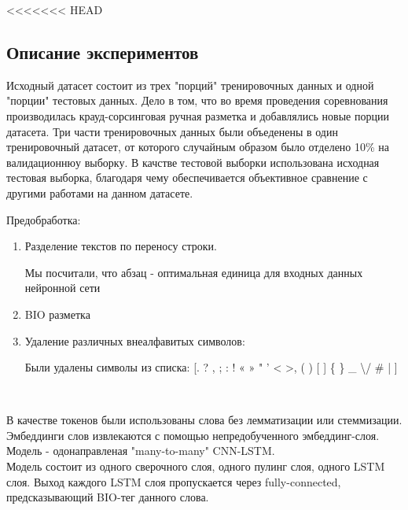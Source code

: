 \documentclass{article}
\begin{document}
<<<<<<< HEAD
\subsection{Описание экспериментов}
Исходный датасет состоит из трех "порций" тренировочных данных и одной "порции" тестовых данных. Дело в том, что во время проведения соревнования производилась крауд-сорсинговая ручная разметка и добавлялись новые порции датасета. Три части тренировочных данных были объеденены в один тренировочный датасет, от которого случайным образом было отделено 10\% на валидационнюу выборку. В качстве тестовой выборки использована исходная тестовая выборка, благодаря чему обеспечивается объективное сравнение с другими работами на данном датасете.
\newline

Предобработка:

\begin{enumerate}
    \item Разделение текстов по переносу строки.

        Мы посчитали, что абзац - оптимальная единица для входных данных нейронной сети

    \item BIO разметка

    \item Удаление различных внеалфавитых символов:

        Были удалены символы из списка: [. ? , ; : ! « » " ' < >,  ( ) [ ] \{ \} \newline
         \─ \- \_ \textbackslash / \# \№ | ] %

\end{enumerate}  \\


\vspace{14pt}

В качестве токенов были использованы слова без лемматизации или стеммизации. \\ %

Эмбеддинги слов извлекаются с помощью непредобученного эмбеддинг-слоя. \\

Модель - одонаправленая "many-to-many"  CNN-LSTM. \\

Модель состоит из одного сверочного слоя, одного пулинг слоя, одного LSTM слоя. Выход каждого LSTM слоя пропускается через fully-connected, предсказывающий BIO-тег данного слова. \\
\end{document}
